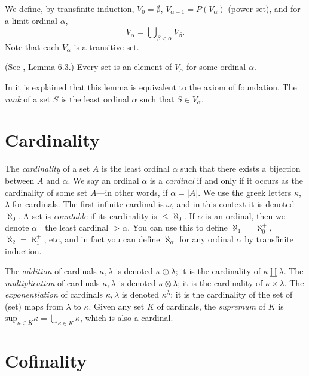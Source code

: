 \medskip\noindent
We define, by transfinite induction, $V_0 = \emptyset$,
$V_{\alpha + 1} = P(V_\alpha)$ (power set),
and for a limit ordinal $\alpha$,
$$
V_\alpha = \bigcup\nolimits_{\beta < \alpha} V_\beta.
$$
Note that each $V_\alpha$ is a transitive set.

\begin{lemma}
\label{lemma-axiom-regularity}
(See \cite{Jech}, Lemma 6.3.)
Every set is an element of $V_\alpha$ for some ordinal $\alpha$.
\end{lemma}

\noindent
In \cite[Chapter III]{Kunen} it is explained that this lemma is
equivalent to the axiom of foundation. The {\it rank} of
a set $S$ is the least ordinal $\alpha$ such that $S \in V_\alpha$.

\section{Cardinality}
\label{section-cardinals}

\noindent
The {\it cardinality} of a set $A$ is the least ordinal $\alpha$
such that there exists a bijection between $A$ and $\alpha$.
We say an ordinal $\alpha$ is a {\it cardinal} if and only
if it occurs as the cardinality of some set $A$---in other words, if
$\alpha = |A|$. We use the greek letters $\kappa$, $\lambda$
for cardinals. The first infinite cardinal is $\omega$, and in this
context it is denoted $\aleph_0$. A set is {\it countable} if its cardinality
is $\leq \aleph_0$. If $\alpha$ is an ordinal, then we denote
$\alpha^+$ the least cardinal $> \alpha$. You can use this to
define $\aleph_1 = \aleph_0^+$, $\aleph_2 = \aleph_1^+$, etc, and
in fact you can define $\aleph_\alpha$ for any ordinal $\alpha$ by
transfinite induction.

\medskip\noindent
The {\it addition} of cardinals $\kappa, \lambda$
is denoted $\kappa \oplus \lambda$; it is the cardinality of
$\kappa \amalg \lambda$. The {\it multiplication} of cardinals
$\kappa, \lambda$ is denoted $\kappa \otimes \lambda$; it is the
cardinality of $\kappa \times \lambda$. The {\it exponentiation}
of cardinals $\kappa, \lambda$ is denoted $\kappa^\lambda$; it is
the cardinality of the set of (set) maps from $\lambda$ to $\kappa$.
Given any set $K$ of cardinals, the {\it supremum} of $K$
is $\text{sup}_{\kappa \in K} \kappa = \bigcup_{\kappa \in K} \kappa$, 
which is also a cardinal.

\section{Cofinality}
\label{section-cofinality}

